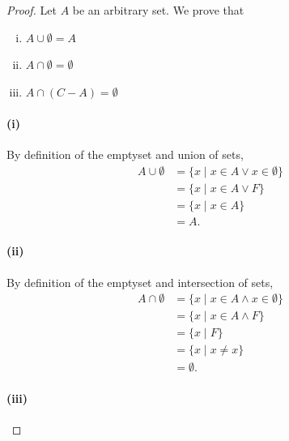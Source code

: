 \documentclass{report}
\begin{document}
\begin{proof}

  \statementpadding




  \noindent Let $A$ be an arbitrary set.
  We prove that
    \begin{enumerate}[(i)]
      \item $A \cup \emptyset = A$
      \item $A \cap \emptyset = \emptyset$
      \item $A \cap (C - A) = \emptyset$
    \end{enumerate}

  \paragraph{(i)}%

    By definition of the emptyset and union of sets,
      \begin{align*}
        A \cup \emptyset
          & = \{ x \mid x \in A \lor x \in \emptyset \} \\
          & = \{ x \mid x \in A \lor F \} \\
          & = \{ x \mid x \in A \} \\
          & = A.
      \end{align*}

  \paragraph{(ii)}%

    By definition of the emptyset and intersection of sets,
      \begin{align*}
        A \cap \emptyset
          & = \{ x \mid x \in A \land x \in \emptyset \} \\
          & = \{ x \mid x \in A \land F \} \\
          & = \{ x \mid F \} \\
          & = \{ x \mid x \neq x \} \\
          & = \emptyset.
      \end{align*}

  \paragraph{(iii)}%


\end{proof}
\end{document}
